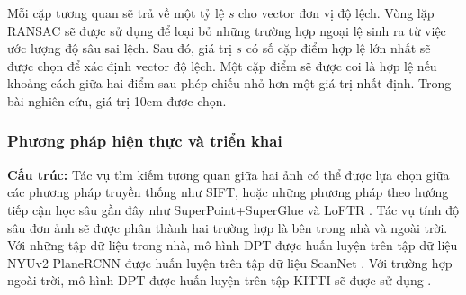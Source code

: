Mỗi cặp tương quan sẽ trả về một tỷ lệ $s$ cho vector đơn vị độ lệch. Vòng lặp RANSAC sẽ được sử dụng để loại bỏ những trường hợp ngoại lệ sinh ra từ việc ước lượng độ sâu sai lệch. Sau đó, giá trị $s$ có số cặp điểm hợp lệ lớn nhất sẽ được chọn để xác định vector độ lệch. Một cặp điểm sẽ được coi là hợp lệ nếu khoảng cách giữa hai điểm sau phép chiếu nhỏ hơn một giá trị nhất định. Trong bài nghiên cứu, giá trị 10cm được chọn.

\subsubsection{Phương pháp hiện thực và triển khai}

\textbf{Cấu trúc:} Tác vụ tìm kiếm tương quan giữa hai ảnh có thể được lựa chọn giữa các phương pháp truyền thống như SIFT, hoặc những phương pháp theo hướng tiếp cận học sâu gần đây như SuperPoint+SuperGlue \cite{sarlin2020superglue} và LoFTR \cite{sun2021loftr}. Tác vụ tính độ sâu đơn ảnh sẽ được phân thành hai trường hợp là bên trong nhà và ngoài trời. Với những tập dữ liệu trong nhà, mô hình DPT \cite{ranftl2021vision} được huấn luyện trên tập dữ liệu NYUv2 \cite{silberman2012indoor} PlaneRCNN \cite{liu2019planercnn} được huấn luyện trên tập dữ liệu ScanNet \cite{dai2017scannet}. Với trường hợp ngoài trời, mô hình DPT \cite{ranftl2021vision} được huấn luyện trên tập KITTI sẽ được sử dụng \cite{geiger2012we}.

